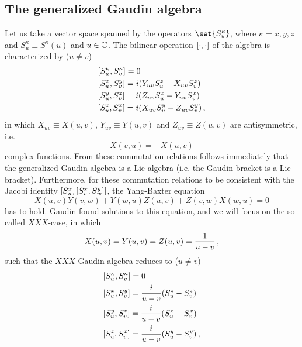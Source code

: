     \subsection{The generalized Gaudin algebra}
        Let us take a vector space spanned by the operators $\set{S^\kappa_u}$, where $\kappa=x,y,z$ and $S^\kappa_u \equiv S^\kappa(u)$ and $u \in \mathbb{C}$. The bilinear operation $\comm{\cdot}{\cdot}$ of the algebra is characterized by ($u \neq v$)
        \begin{align}
            & \comm{S^\kappa_u}{S^\kappa_v} = 0 \\
            & \comm{S^x_u}{S^y_v} = i \qty( Y_{uv} S^z_u - X_{uv} S^z_v ) \\
            & \comm{S^y_u}{S^z_v} = i \qty( Z_{uv} S^x_u - Y_{uv} S^x_v ) \\
            & \comm{S^z_u}{S^x_v} = i \qty( X_{uv} S^y_u - Z_{uv} S^y_v ) \thinspace ,
        \end{align}
        in which $X_{uv} \equiv X(u,v)$, $Y_{uv} \equiv Y(u,v)$ and $Z_{uv} \equiv Z(u,v)$ are antisymmetric, i.e.
        \begin{equation}
            X(v, u) = - X(u, v)
        \end{equation}
        complex functions. From these commutation relations follows immediately that the generalized Gaudin algebra is a Lie algebra (i.e. the Gaudin bracket is a Lie bracket). Furthermore, for these commutation relations to be consistent with the Jacobi identity $\comm{S^x_u}{\comm{S^x_v}{S^y_w}}$, the Yang-Baxter equation
        \begin{equation}
            X(u, v) Y(v, w) + Y(w, u) Z(u, v) + Z(v, w) X(w, u) = 0
        \end{equation}
        has to hold. Gaudin \cite{gaudin1976} found solutions to this equation, and we will focus on the so-called $XXX$-case, in which
        \begin{equation}
            X(u, v) = Y(u, v) = Z(u, v) = \frac{1}{u - v} \thinspace ,
        \end{equation}
        such that the $XXX$-Gaudin algebra reduces to ($u \neq v$)
        \begin{align}
            & \comm{S^\kappa_u}{S^\kappa_v} = 0 \\
            & \comm{S^x_u}{S^y_v} = \frac{i}{u-v} \qty(S^z_u - S^z_v) \\
            & \comm{S^y_u}{S^z_v} = \frac{i}{u-v} \qty(S^x_u - S^x_v) \\
            & \comm{S^z_u}{S^x_v} = \frac{i}{u-v} \qty(S^y_u - S^y_v) \thinspace ,
        \end{align}
